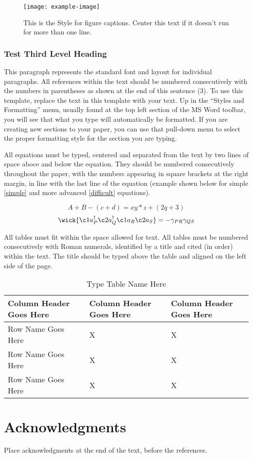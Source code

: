 \documentclass[twoside,onecolumn,12pt]{article}
\begin{document}
\begin{figure}[htb]
    \centering
    \texttt{[image: example-image]}
    \caption{This is the Style for figure captions. Center this text if it doesn't run for more than one line.}
\end{figure}

\subsubsection{Test Third Level Heading}
This paragraph represents the standard font and layout for individual paragraphs. All references within the text should be numbered consecutively with the numbers in parentheses as shown at the end of this sentence (3). To use this template, replace the text in this template with your text. Up in the “Styles and Formatting” menu, usually found at the top left section of the MS Word toolbar, you will see that what you type will automatically be formatted. If you are creating new sections to your paper, you can use that pull-down menu to select the proper formatting style for the section you are typing.

All equations must be typed, centered and separated from the text by two lines of space aboce and below the equation. They should be numbered consecutively throughout the paper, with the numbers appearing in square brackets at the right margin, in line with the last line of the equation (example shown below for simple \eqref{simple} and more advanced \eqref{difficult} equations).

\begin{equation}
    A+B - (c+d) = xy*z+(2q+3) \label{simple}
\end{equation}
\begin{equation}
    \wick{\c1 a_P^\dagger \c2 a_Q^\dagger \c1 a_R \c2 a_S} = -\gamma_{PR}\gamma_{QS} \label{difficult}
\end{equation}

All tables must fit within the space allowed for text. All tables must be numbered consecutively with Roman numerals, identified by a title and cited (in order) within the text. The title should be typed above the table and aligned on the left side of the page.

\begin{table}[H]
    \caption{Type Table Name Here}
    \begin{tabularx}{\columnwidth}{l|X|X}
        \hline
        \textbf{Column Header Goes Here} & \textbf{Column Header Goes Here} & \textbf{Column Header Goes Here}\\
        \hline
        Row Name Goes Here & X & X\\
        Row Name Goes Here & X & X\\
        Row Name Goes Here & X & X\\
        \hline
    \end{tabularx}
\end{table}

\section{Acknowledgments}
Place acknowledgments at the end of the text, before the references.

\printbibliography
\end{document}
